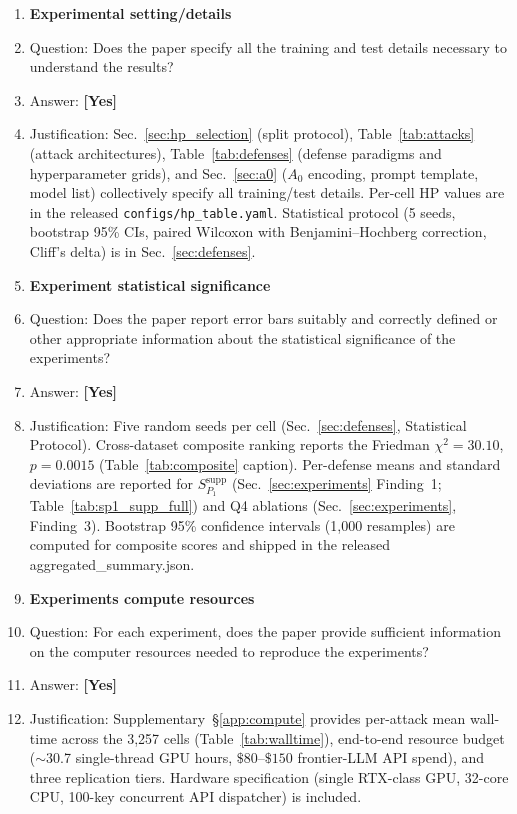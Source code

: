 \documentclass{article}
\theoremstyle{remark}
\begin{document}
\begin{enumerate}
\item {\bf Experimental setting/details}
\item[] Question: Does the paper specify all the training and test details necessary to understand the results?
\item[] Answer: \textbf{[Yes]}
\item[] Justification: Sec.~\ref{sec:hp_selection} (split protocol), Table~\ref{tab:attacks} (attack architectures), Table~\ref{tab:defenses} (defense paradigms and hyperparameter grids), and Sec.~\ref{sec:a0} ($A_0$ encoding, prompt template, model list) collectively specify all training/test details. Per-cell HP values are in the released \texttt{configs/hp\_table.yaml}. Statistical protocol (5 seeds, bootstrap 95\% CIs, paired Wilcoxon with Benjamini--Hochberg correction, Cliff's delta) is in Sec.~\ref{sec:defenses}.

\item {\bf Experiment statistical significance}
\item[] Question: Does the paper report error bars suitably and correctly defined or other appropriate information about the statistical significance of the experiments?
\item[] Answer: \textbf{[Yes]}
\item[] Justification: Five random seeds per cell (Sec.~\ref{sec:defenses}, Statistical Protocol). Cross-dataset composite ranking reports the Friedman $\chi^2 = 30.10$, $p = 0.0015$ (Table~\ref{tab:composite} caption). Per-defense means and standard deviations are reported for $S_{P_1}^{\text{supp}}$ (Sec.~\ref{sec:experiments} Finding~1; Table~\ref{tab:sp1_supp_full}) and Q4 ablations (Sec.~\ref{sec:experiments}, Finding~3). Bootstrap 95\% confidence intervals (1{,}000 resamples) are computed for composite scores and shipped in the released aggregated\_summary.json.

\item {\bf Experiments compute resources}
\item[] Question: For each experiment, does the paper provide sufficient information on the computer resources needed to reproduce the experiments?
\item[] Answer: \textbf{[Yes]}
\item[] Justification: Supplementary~\S\ref{app:compute} provides per-attack mean wall-time across the 3{,}257 cells (Table~\ref{tab:walltime}), end-to-end resource budget ($\sim$30.7 single-thread GPU hours, $\$80$--$\$150$ frontier-LLM API spend), and three replication tiers. Hardware specification (single RTX-class GPU, 32-core CPU, 100-key concurrent API dispatcher) is included.


\end{enumerate}
\end{document}

